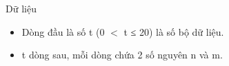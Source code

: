 Dữ liệu  
\begin{itemize}
	\item     Dòng đầu là số t (0 $<$ t ≤ 20) là số bộ dữ liệu.   
	\item     t dòng sau, mỗi dòng chứa 2 số nguyên n và m.   
\end{itemize}